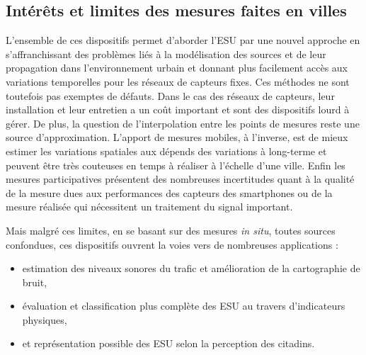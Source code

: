 \subsection{Intérêts et limites des mesures faites en villes}

L'ensemble de ces dispositifs permet d'aborder l'ESU par une nouvel approche en s'affranchissant des problèmes liés à la modélisation des sources et de leur propagation dans l'environnement urbain et donnant plus facilement accès aux variations temporelles pour les réseaux de capteurs fixes. Ces méthodes ne sont toutefois pas exemptes de défauts. 
Dans le cas des réseaux de capteurs, leur installation et leur entretien a un coût important et sont des dispositifs lourd à gérer. De plus, la question de l'interpolation entre les points de mesures reste une source d'approximation. 
L'apport de mesures mobiles, à l'inverse, est de mieux estimer les variations spatiales aux dépends des variations à long-terme et peuvent être très couteuses en temps à réaliser à l'échelle d'une ville. Enfin les mesures participatives présentent des nombreuses incertitudes quant à la qualité de la mesure dues aux performances des capteurs des smartphones ou de la mesure réalisée qui nécessitent un traitement du signal important.

Mais malgré ces limites, en se basant sur des mesures \textit{in situ}, toutes sources confondues, ces dispositifs ouvrent la voies vers de nombreuses applications : 

\begin{itemize}
\item estimation des niveaux sonores du trafic et amélioration de la cartographie de bruit,
\item évaluation et classification plus complète des ESU au travers d'indicateurs physiques,
\item et représentation possible des ESU selon la perception des citadins.
\end{itemize}

